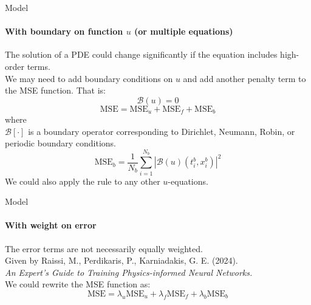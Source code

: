     \begin{frame}{Model}
    \framesubtitle{With boundary on function \( u \) (or multiple equations)}
        The solution of a PDE could change significantly if the equation includes high-order terms.\\
        We may need to add boundary conditions on \( u \) and add another penalty term to the MSE function. That is:
        \begin{equation}
        \mathcal{B}(u) = 0
        \end{equation}
        \begin{equation}
        \text{MSE} = \text{MSE}_u + \text{MSE}_f + \text{MSE}_b
        \end{equation}
        where\\
        \( \mathcal{B}[\cdot] \) is a boundary operator corresponding to Dirichlet, Neumann, Robin, or periodic boundary conditions. 
        \begin{equation}
        \text{MSE}_b = \frac{1}{N_b} \sum_{i=1}^{N_b} | \mathcal{B}(u)(t_i^b, x_i^b) |^2
        \end{equation}
        We could also apply the rule to any other \( u \)-equations.
    \end{frame}
    
    \begin{frame}{Model}
    \framesubtitle{With weight on error}
        The error terms are not necessarily equally weighted.\\
        Given by Raissi, M., Perdikaris, P., Karniadakis, G. E. (2024).\\
        \textit{An Expert’s Guide to Training Physics-informed Neural Networks.}\\
        We could rewrite the MSE function as:
        \begin{equation}
        \text{MSE} = \lambda_u \text{MSE}_u + \lambda_f \text{MSE}_f + \lambda_b \text{MSE}_b
        \end{equation}
    \end{frame}
    
